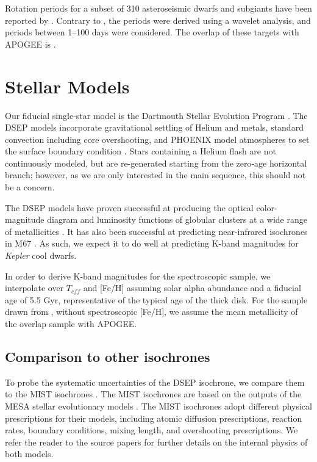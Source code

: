 \documentclass[manuscript]{aastex6}
\newcommand{\Kepler}{\mbox{\textit{Kepler}}}
\newcommand{\Teff}{\ensuremath{T_{eff}}}
\newcommand{\gvs}{\authorcomment1}
\begin{document}
Rotation periods for a subset of 310 asteroseismic dwarfs and subgiants have been reported 
by \citet{Garcia14}. Contrary to \citet{McQuillan14}, the \citet{Garcia14}
periods were derived using a wavelet analysis, and periods between 1--100 days
were considered. The overlap of these targets with APOGEE is \gvs{NUM}.

\section{Stellar Models}

Our fiducial single-star model is the Dartmouth Stellar Evolution Program
\citep[DSEP]{Dotter08}. The DSEP models incorporate gravitational settling of
Helium and metals, standard convection including core overshooting, and PHOENIX
model atmospheres to set the surface boundary condition \citep{Hauschildt99a,
Hauschildt99b}. Stars containing a Helium flash are not continuously modeled,
but are re-generated starting from the zero-age horizontal branch; however, as
we are only interested in the main sequence, this should not be a
concern\citep{Dotter08}.

The DSEP models have proven successful at producing the optical color-magnitude
diagram and luminosity functions of globular clusters at a wide range of
metallicities \citep{Dotter07}. It has also been successful at predicting
near-infrared isochrones in M67 \citep{Sarajedini09}. As such, we expect it to
do well at predicting K-band magnitudes for \Kepler{} cool dwarfs.

In order to derive K-band magnitudes for the spectroscopic sample, we 
interpolate over \Teff{} and [Fe/H]
assuming solar alpha abundance and a fiducial age of 5.5 Gyr, representative
of the typical age of the thick disk. For the sample drawn from
\citet{McQuillan14}, without spectroscopic [Fe/H], we assume the mean
metallicity of the overlap sample with APOGEE\@.


\subsection{Comparison to other isochrones}

To probe the systematic uncertainties of the DSEP isochrone, we compare them to
the MIST isochrones \citep{Dotter16, Choi16}. The MIST isochrones are based on 
the outputs of the MESA stellar evolutionary models \citep{Paxton11, Paxton13, 
Paxton15}. The MIST isochrones adopt different physical prescriptions for their
models, including atomic diffusion prescriptions, reaction rates, boundary
conditions, mixing length, and overshooting prescriptions. We refer the reader
to the source papers for further details on the internal physics of both
models.
\end{document}
